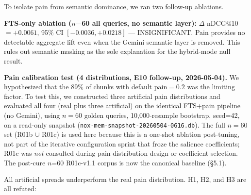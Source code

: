 To isolate pain from semantic dominance, we ran two follow-up ablations.

\textbf{FTS-only ablation ($n$=60 all queries, no semantic layer):}
$\Delta$ nDCG@10 $= +0.0061$, 95\% CI $[-0.0036, +0.0218]$ --- INSIGNIFICANT. Pain
provides no detectable aggregate lift even when the Gemini semantic layer is removed. This
rules out semantic masking as the sole explanation for the hybrid-mode null result.

\textbf{Pain calibration test (4 distributions, E10 follow-up, 2026-05-04).} We
hypothesized that the 89\% of chunks with default $\text{pain}=0.2$ was the limiting
factor. To test this, we constructed three artificial pain distributions and evaluated all
four (real plus three artificial) on the identical FTS+pain pipeline (no Gemini), using
$n=60$ golden queries, 10,000-resample bootstrap, seed=42, on a read-only snapshot
(\texttt{nox-mem-snapshot-20260504-0616.db}). The full $n=60$ set (R01b $\cup$ R01c) is
used here because this is a one-shot ablation post-tuning, not part of the iterative
configuration sprint that froze the salience coefficients; R01c was \emph{not} consulted
during pain-distribution design or coefficient selection. The post-cure $n$=60 R01c-v1.1 corpus
is now the canonical baseline (\S5.1).

\begin{table}[t]
  \caption{Pain calibration test --- pairwise comparisons against real distribution
    ($n$=60 queries, FTS+pain only, bootstrap 95\% CI).}
  \label{tab:calibration}
  \centering
\end{table}

All artificial spreads underperform the real pain distribution. H1, H2, and H3 are all
refuted:

